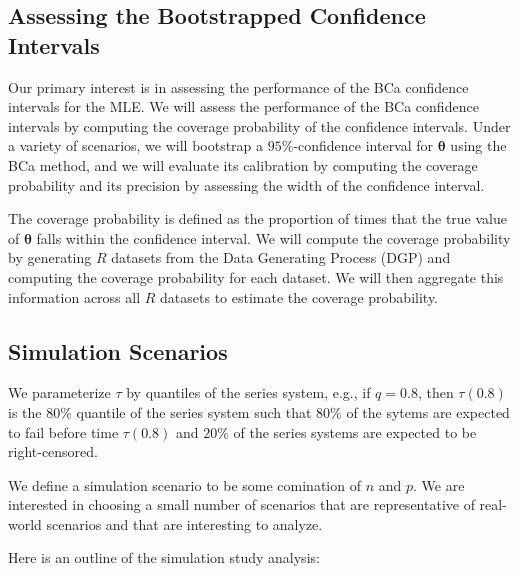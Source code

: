\documentclass[
]{article}
\begin{document}
\hypertarget{assessing-the-bootstrapped-confidence-intervals}{%
\subsection{Assessing the Bootstrapped Confidence
Intervals}\label{assessing-the-bootstrapped-confidence-intervals}}

Our primary interest is in assessing the performance of the BCa
confidence intervals for the MLE. We will assess the performance of the
BCa confidence intervals by computing the coverage probability of the
confidence intervals. Under a variety of scenarios, we will bootstrap a
\(95\%\)-confidence interval for \(\boldsymbol{\theta}\) using the BCa
method, and we will evaluate its calibration by computing the coverage
probability and its precision by assessing the width of the confidence
interval.

The coverage probability is defined as the proportion of times that the
true value of \(\boldsymbol{\theta}\) falls within the confidence
interval. We will compute the coverage probability by generating \(R\)
datasets from the Data Generating Process (DGP) and computing the
coverage probability for each dataset. We will then aggregate this
information across all \(R\) datasets to estimate the coverage
probability.

\hypertarget{simulation-scenarios}{%
\subsection{Simulation Scenarios}\label{simulation-scenarios}}

We parameterize \(\tau\) by quantiles of the series system, e.g., if
\(q = 0.8\), then \(\tau(0.8)\) is the \(80\%\) quantile of the series
system such that \(80\%\) of the sytems are expected to fail before time
\(\tau(0.8)\) and \(20\%\) of the series systems are expected to be
right-censored.

We define a simulation scenario to be some comination of \(n\) and
\(p\). We are interested in choosing a small number of scenarios that
are representative of real-world scenarios and that are interesting to
analyze.

Here is an outline of the simulation study analysis:
\end{document}
